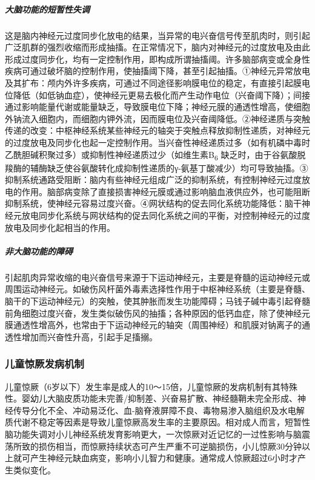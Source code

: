 \subparagraph{大脑功能的短暂性失调}

这是脑内神经元过度同步化放电的结果，当异常的电兴奋信号传至肌肉时，则引起广泛肌群的强烈收缩而形成抽搐。在正常情况下，脑内对神经元的过度放电及由此形成过度同步化，均有一定控制作用，即构成所谓抽搐阈。许多脑部病变或全身性疾病可通过破坏脑的控制作用，使抽搐阈下降，甚至引起抽搐。①神经元异常放电及其扩布：颅内外许多疾病，可通过不同途径影响膜电位的稳定，有直接引起膜电位降低（如低钠血症），使神经元更易去极化而产生动作电位（兴奋阈下降）；间接通过影响能量代谢或能量缺乏，导致膜电位下降；神经元膜的通透性增高，使细胞外钠流入细胞内，而细胞内钾外流，因而膜电位及兴奋阈降低。②神经递质与突触传递的改变：中枢神经系统某些神经元的轴突于突触点释放抑制性递质，对神经元的过度放电及同步化也起一定控制作用。当兴奋性神经递质过多（如有机磷中毒时乙酰胆碱积聚过多）或抑制性神经递质过少（如维生素B\textsubscript{6}
缺乏时，由于谷氨酸脱羧酶的辅酶缺乏使谷氨酸转化成抑制性递质的γ-氨基丁酸减少）均可导致抽搐。③抑制系统通路受阻断：脑内有些神经元组成广泛的抑制系统，有控制神经元过度放电的作用。脑部病变除了直接损害神经元膜或通过影响脑血液供应外，也可能阻断抑制系统，使神经元容易过度兴奋。④网状结构的促去同化系统功能降低：脑干神经元放电同步化系统与网状结构的促去同化系统之间的平衡，对控制神经元的过度放电及同步化起相当的作用。

\subparagraph{非大脑功能的障碍}

引起肌肉异常收缩的电兴奋信号来源于下运动神经元，主要是脊髓的运动神经元或周围运动神经元。如破伤风杆菌外毒素选择性作用于中枢神经系统（主要是脊髓、脑干的下运动神经元）的突触，使其肿胀而发生功能障碍；马钱子碱中毒引起脊髓前角细胞过度兴奋，发生类似破伤风的抽搐；各种原因的低钙血症，除了使神经元膜通透性增高外，也常由于下运动神经元的轴突（周围神经）和肌膜对钠离子的通透性增加而兴奋性升高，引起手足搐搦。

\subsubsection{儿童惊厥发病机制}

儿童惊厥（6岁以下）发生率是成人的10～15倍，儿童惊厥的发病机制有其特殊性。婴幼儿大脑皮质功能未完善/抑制差、兴奋易扩散、神经髓鞘未完全形成、神经传导分化不全、冲动易泛化、血-脑脊液屏障不良、毒物易渗入脑组织及水电解质代谢不稳定等因素是导致儿童惊厥高发生率的主要原因。相对成人而言，短暂性脑功能失调对小儿神经系统发育影响更大，一次惊厥对近记忆的一过性影响与脑震荡所致的损伤相当，而惊厥持续状态可产生严重不可逆脑损伤，小儿惊厥30分钟以上就可产生神经元缺血病变，影响小儿智力和健康。通常成人惊厥超过6小时才产生类似变化。

